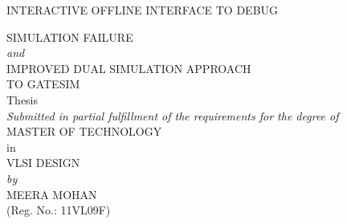 \documentclass[a4paper,12pt]{report}
\begin{document}
\begin{titlepage}
\begin{center}

{\Large INTERACTIVE OFFLINE INTERFACE TO DEBUG}\\
\vspace{3.5pt}

{\Large SIMULATION FAILURE}\\
\vspace{3.5pt}
{\emph{and}}\\
\vspace{3.5pt}
{\Large IMPROVED DUAL SIMULATION APPROACH}\\
\vspace{3.5pt}
{\Large TO GATESIM}\\
\vspace{5pt}
Thesis\\
{\emph {Submitted in partial fulfillment of the requirements for the degree of}} \\
\vspace{10pt}
{\Large MASTER OF TECHNOLOGY}\\
\vspace{5pt}
in\\
\vspace{5pt}
{ \Large VLSI DESIGN}\\
\vspace{20pt}
\textit {by} \\
\vspace{10pt}
{\Large MEERA MOHAN}\\ 
{(Reg. No.: 11VL09F)}\\

\end{center}
\end{titlepage}
\end{document}

